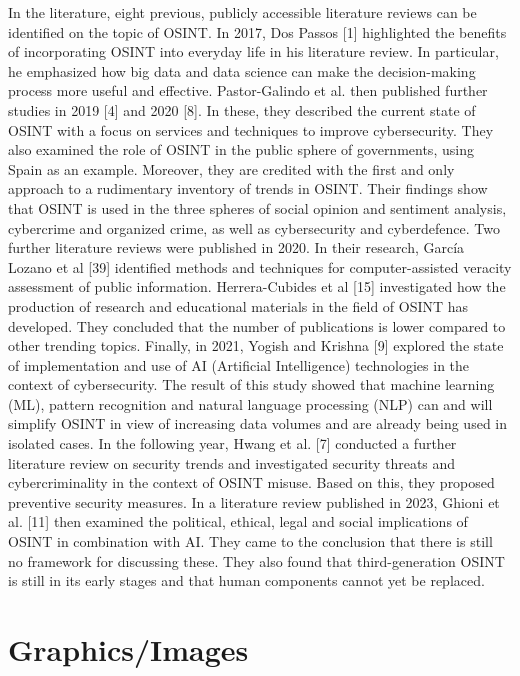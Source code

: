 \documentclass[10pt]{article}
\begin{document}
In the literature, eight previous, publicly accessible literature reviews can be identified on the topic of OSINT. In 2017, Dos Passos [1] highlighted the benefits of incorporating OSINT into everyday life in his literature review. In particular, he emphasized how big data and data science can make the decision-making process more useful and effective. Pastor-Galindo et al. then published further studies in 2019 [4] and 2020 [8]. In these, they described the current state of OSINT with a focus on services and techniques to improve cybersecurity. They also examined the role of OSINT in the public sphere of governments, using Spain as an example. Moreover, they are credited with the first and only approach to a rudimentary inventory of trends in OSINT. Their findings show that OSINT is used in the three spheres of social opinion and sentiment analysis, cybercrime and organized crime, as well as cybersecurity and cyberdefence. Two further literature reviews were published in 2020. In their research, García Lozano et al [39] identified methods and techniques for computer-assisted veracity assessment of public information. Herrera-Cubides et al [15] investigated how the production of research and educational materials in the field of OSINT has developed. They concluded that the number of publications is lower compared to other trending topics. Finally, in 2021, Yogish and Krishna [9] explored the state of implementation and use of AI (Artificial Intelligence) technologies in the context of cybersecurity. The result of this study showed that machine learning (ML), pattern recognition and natural language processing (NLP) can and will simplify OSINT in view of increasing data volumes and are already being used in isolated cases. In the following year, Hwang et al. [7] conducted a further literature review on security trends and investigated security threats and cybercriminality in the context of OSINT misuse. Based on this, they proposed preventive security measures. In a literature review published in 2023, Ghioni et al. [11] then examined the political, ethical, legal and social implications of OSINT in combination with AI. They came to the conclusion that there is still no framework for discussing these. They also found that third-generation OSINT is still in its early stages and that human components cannot yet be replaced.



\section{Graphics/Images}
\end{document}
